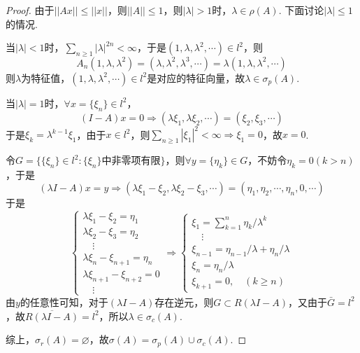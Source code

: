 \documentclass[12pt, a4paper, oneside]{ctexart}
\let\leq=\leqslant %
\let\geq=\geqslant %
\def\ol{\overline}          %
\begin{document}
\begin{proof}
    由于$||Ax||\leq ||x||$，则$||A||\leq 1$，则$|\lambda| > 1$时，$\lambda \in \rho(A)$. 下面讨论$|\lambda|\leq 1$的情况.

    当$|\lambda| < 1$时，$\sum_{n\geq 1}|\lambda|^{2n} < \infty$，于是$(1,\lambda,\lambda^2,\cdots)\in l^2$，则
    \begin{equation*}
        A_n(1,\lambda,\lambda^2) = (\lambda,\lambda^2,\lambda^3,\cdots) = \lambda(1,\lambda,\lambda^2,\cdots)
    \end{equation*}
    则$\lambda$为特征值，$(1,\lambda,\lambda^2,\cdots)\in l^2$是对应的特征向量，故$\lambda\in \sigma_p(A)$.

    当$|\lambda|=1$时，$\forall x = \{\xi_n\} \in l^2$，
    \begin{equation*}
        (I-A)x = 0\Rightarrow (\lambda\xi_1,\lambda\xi_2,\cdots) = (\xi_2,\xi_3,\cdots)
    \end{equation*}
    于是$\xi_k = \lambda^{k-1}\xi_1$，由于$x\in l^2$，则$\sum_{n\geq 1}|\xi_1|^2 < \infty\Rightarrow \xi_1 = 0$，故$x=0$.

    令$G = \{\{\xi_n\}\in l^2:\{\xi_n\}\text{中非零项有限}\}$，则$\forall y = \{\eta_k\}\in G$，不妨令$\eta_k = 0(k > n)$，于是
    \begin{equation*}
        (\lambda I-A)x = y\Rightarrow (\lambda\xi_1-\xi_2,\lambda\xi_2-\xi_3,\cdots) = (\eta_1,\eta_2,\cdots, \eta_n,0,\cdots)
    \end{equation*}
    于是
    \begin{equation*}
        \begin{cases}
            \lambda\xi_1-\xi_2 = \eta_1\\
            \lambda\xi_2-\xi_3 = \eta_2\\
            \quad\vdots\\
            \lambda\xi_n-\xi_{n+1} = \eta_n\\
            \lambda\xi_{n+1}-\xi_{n+2} = 0\\
            \quad\vdots
        \end{cases}\Rightarrow\begin{cases}
            \xi_1 = \sum_{k=1}^n\eta_k/\lambda^k\\
            \quad\vdots\\
            \xi_{n-1} = \eta_{n-1}/\lambda+\eta_n/\lambda\\
            \xi_n=\eta_n/\lambda\\
            \xi_{k+1}=0,\quad(k\geq n)
        \end{cases}
    \end{equation*}
    由$y$的任意性可知，对于$(\lambda I-A)$存在逆元，则$G\subset R(\lambda I-A)$，又由于$\bar{G} = l^2$，故$\ol{R(\lambda I-A)} = l^2$，所以$\lambda\in \sigma_c(A)$.

    综上，$\sigma_r(A) = \varnothing$，故$\sigma(A) = \sigma_p(A)\cup\sigma_c(A)$.
\end{proof}
\end{document}
